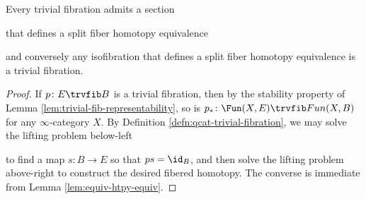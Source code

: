 \begin{lem}\label{lem:split-triv-fib} Every trivial fibration admits a section
\begin{center}
\end{center}
that defines a split fiber homotopy equivalence
\begin{center}
\end{center}
and conversely any isofibration that defines a split fiber homotopy equivalence is a trivial fibration.
\end{lem}
\begin{proof}
If $p \colon E \trvfib B$ is a trivial fibration, then by the stability property of Lemma \ref{lem:trivial-fib-representability}, so is $p_*\colon\Fun(X,E)\trvfib Fun(X,B)$ for any $\infty$-category $X$.  By Definition \ref{defn:qcat-trivial-fibration}, we may solve the lifting problem below-left
\begin{center}
\end{center}
to find a map $s \colon B \to E$ so that $ps = \id_B$, and then solve the lifting problem above-right to construct the desired fibered homotopy. The converse is immediate from Lemma \ref{lem:equiv-htpy-equiv}.
\end{proof}


